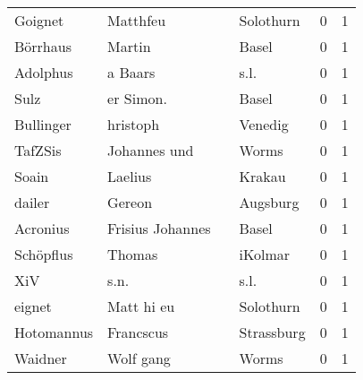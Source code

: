 \documentclass[10pt,a4paper,landscape]{article}
\begin{document}
\begin{longtable}{llllrr}
                  Goignet &                           Matthfeu &             &                                   Solothurn &          0 &         1 \\
                 Börrhaus &                             Martin &             &                                       Basel &          0 &         1 \\
                 Adolphus &                            a Baars &             &                                        s.l. &          0 &         1 \\
                     Sulz &                          er Simon. &             &                                       Basel &          0 &         1 \\
                Bullinger &                           hristoph &             &                                     Venedig &          0 &         1 \\
                  TafZSis &                       Johannes und &             &                                       Worms &          0 &         1 \\
                    Soain &                            Laelius &             &                                      Krakau &          0 &         1 \\
                   dailer &                             Gereon &             &                                    Augsburg &          0 &         1 \\
                 Acronius &                   Frisius Johannes &             &                                       Basel &          0 &         1 \\
                Schöpflus &                             Thomas &             &                                     iKolmar &          0 &         1 \\
                      XiV &                               s.n. &             &                                        s.l. &          0 &         1 \\
                   eignet &                         Matt hi eu &             &                                   Solothurn &          0 &         1 \\
               Hotomannus &                          Francscus &             &                                  Strassburg &          0 &         1 \\
                  Waidner &                          Wolf gang &             &                                       Worms &          0 &         1 \\

\end{longtable}
\end{document}
